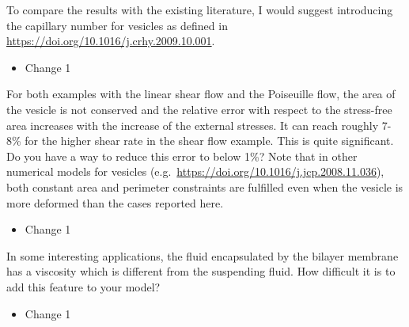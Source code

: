 \documentclass[11pt]{article}
\newcommand{\comment}[1]{{\color{blue} #1}}
\begin{document}
\noindent
\comment{To compare the results with the existing literature, I would
suggest introducing the capillary number for vesicles as defined in
\url{https://doi.org/10.1016/j.crhy.2009.10.001}.}
\begin{itemize}
  \item Change 1 
\end{itemize}

\noindent
\comment{For both examples with the linear shear flow and the Poiseuille
flow, the area of the vesicle is not conserved and the relative error
with respect to the stress-free area increases with the increase of the
external stresses. It can reach roughly 7-8\% for the higher shear rate
in the shear flow example. This is quite significant. Do you have a way
to reduce this error to below 1\%? Note that in other numerical models
for vesicles (e.g.~\url{https://doi.org/10.1016/j.jcp.2008.11.036}),
both constant area and perimeter constraints are fulfilled even when the
vesicle is more deformed than the cases reported here.}
\begin{itemize}
  \item Change 1 
\end{itemize}

\noindent
\comment{In some interesting applications, the fluid encapsulated by the
bilayer membrane has a viscosity which is different from the suspending
fluid. How difficult it is to add this feature to your model?}
\begin{itemize}
  \item Change 1 
\end{itemize}
\end{document}
